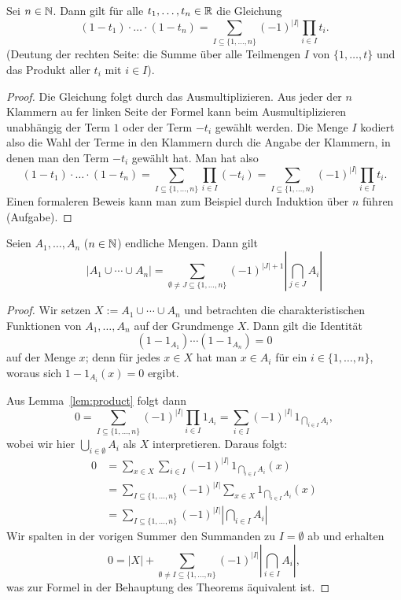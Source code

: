 \begin{lem} \label{lem:product} 
	Sei $n \in \mathbb{N}$. Dann gilt für alle $t_1,\ldots,t_n \in \mathbb{R}$ die Gleichung 
	\[
		(1 - t_1) \cdot \ldots \cdot  (1-t_n) = \sum_{I \subseteq \{1,\ldots,n\}} (-1)^{|I|} \prod_{i \in I} t_i.  
	\]
	(Deutung der rechten Seite: die Summe über alle Teilmengen $I$ von $\{1,\ldots,t\}$ und das Produkt aller $t_i$ mit $i \in I$). 
\end{lem} 
\begin{proof} 
	Die Gleichung folgt durch das Ausmultiplizieren. Aus jeder der $n$ Klammern au fer linken Seite der Formel kann  beim Ausmultiplizieren unabhängig der Term $1$ oder der Term $-t_i$ gewählt werden. Die Menge $I$ kodiert also die Wahl der Terme in den Klammern durch die Angabe der Klammern, in denen man den Term $-t_i$ gewählt hat. Man hat also 
	\[
			(1 - t_1) \cdot \ldots \cdot  (1-t_n) = \sum_{I \subseteq \{1,\ldots,n\}}  \prod_{i \in I} (-t_i)  = \sum_{I \subseteq \{1,\ldots,n\}} (-1)^{|I|} \prod_{i \in I} t_i.
	\]
	Einen formaleren Beweis kann man zum Beispiel durch Induktion über $n$ führen (Aufgabe). 
\end{proof} 

\begin{thm}
	Seien $A_1,\ldots,A_n$ ($n \in \mathbb{N}$) endliche Mengen. Dann gilt 
	\[
		| A_1 \cup \cdots \cup A_n| = \sum_{\emptyset \ne J \subseteq \{1,\ldots,n\}} (-1)^{|J|+1} \left| \bigcap_{j \in J} A_i \right| 
	\]
\end{thm} 
\begin{proof} 
	Wir setzen $X := A_1 \cup \cdots \cup A_n$ und betrachten die charakteristischen Funktionen von $A_1,\ldots,A_n$ auf der Grundmenge $X$. Dann gilt die Identität
	\[
		  (1-1_{A_1} )  \cdots (1 -1_{A_n}) = 0
	\]
	auf der Menge $x$; denn für jedes $x \in X$ hat man $x \in A_i$ für ein $i \in \{1,\ldots,n\}$, woraus sich $1 - 1_{A_i}(x) = 0$ ergibt. 
	
	Aus Lemma~\ref{lem:product} folgt dann 
	\[
		 0 = \sum_{I \subseteq \{1,\ldots,n\}} (-1)^{|I|} \prod_{i \in I} 1_{A_i} = \sum_{i \in I} (-1)^{|I| } \, 1_{\bigcap_{i \in I} A_i},
	\]
	wobei wir hier $\bigcup_{i \in \emptyset} A_i$ als $X$ interpretieren. 
	Daraus folgt: 
	\begin{align*}
		0  & = \sum_{x \in X} \sum_{i \in I} (-1)^{|I| } \, 1_{\bigcap_{i \in I} A_i}(x)
		\\ & = \sum_{I \subseteq \{1,\ldots,n\} } (-1)^{|I| } \sum_{x \in X} 1_{\bigcap_{i \in I} A_i}(x)
		\\ & = \sum_{I \subseteq \{1,\ldots,n\}} (-1)^{|I| } \left| \bigcap_{i \in I} A_i \right|
	\end{align*}
	Wir spalten in der vorigen Summer den Summanden zu $I = \emptyset$ ab und erhalten 
	\[
		0  = |X| + \sum_{\emptyset \ne I \subseteq \{1,\ldots,n\}} (-1)^{|I| } \left| \bigcap_{i \in I} A_i \right|,
	\]
	was zur Formel in der Behauptung des Theorems äquivalent ist. 
\end{proof} 


